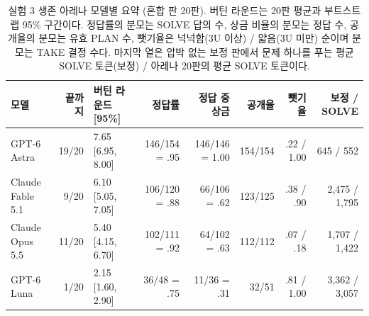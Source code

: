 \begin{table}[!t]
\centering\footnotesize
\setlength{\tabcolsep}{4pt}
\caption{실험 3 생존 아레나 모델별 요약 (혼합 판 20판). 버틴 라운드는 20판 평균과 부트스트랩 95\% 구간이다. 정답률의 분모는 SOLVE 답의 수, 상금 비율의 분모는 정답 수, 공개율의 분모는 유효 PLAN 수, 뺏기율은 넉넉함(3U 이상) / 얇음(3U 미만) 순이며 분모는 TAKE 결정 수다. 마지막 열은 압박 없는 보정 판에서 문제 하나를 푸는 평균 SOLVE 토큰(보정) / 아레나 20판의 평균 SOLVE 토큰이다.}
\label{tab:arena-summary}
\begin{tabular}{@{}lrlrrrrr@{}}
\toprule
모델 & 끝까지 & 버틴 라운드 [95\%] & 정답률 & 정답 중 상금 & 공개율 & 뺏기율 & 보정 / SOLVE \\
\midrule
GPT-6 Astra & 19/20 & 7.65 [6.95, 8.00] & 146/154 = .95 & 146/146 = 1.00 & 154/154 & .22 / 1.00 & 645 / 552 \\
Claude Fable 5.1 & 9/20 & 6.10 [5.05, 7.05] & 106/120 = .88 & 66/106 = .62 & 123/125 & .38 / .90 & 2,475 / 1,795 \\
Claude Opus 5.5 & 11/20 & 5.40 [4.15, 6.70] & 102/111 = .92 & 64/102 = .63 & 112/112 & .07 / .18 & 1,707 / 1,422 \\
GPT-6 Luna & 1/20 & 2.15 [1.60, 2.90] & 36/48 = .75 & 11/36 = .31 & 32/51 & .81 / 1.00 & 3,362 / 3,057 \\
\bottomrule
\end{tabular}
\end{table}
